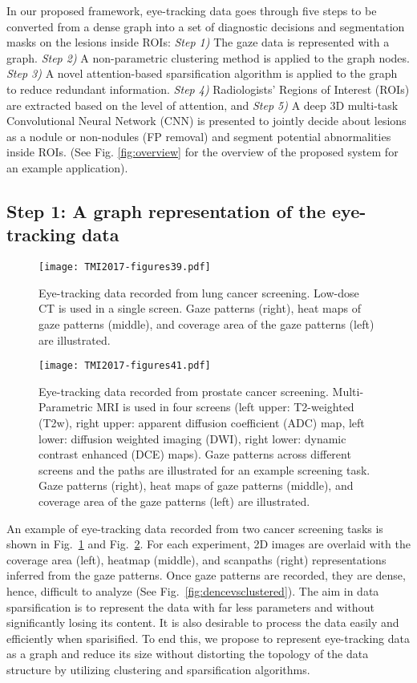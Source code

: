 \documentclass[preprint,12pt]{elsarticle}
\begin{document}
In our proposed framework, eye-tracking data goes through five steps to be converted from a dense graph into a set of diagnostic decisions and segmentation masks on the lesions inside ROIs: \textit{Step 1)} The gaze data is represented with a graph. \textit{Step 2)} A non-parametric clustering method is applied to the graph nodes.\textit{ Step 3)} A novel attention-based sparsification algorithm is applied to the graph to reduce redundant information. \textit{Step 4)} Radiologists' Regions of Interest (ROIs) are extracted based on the level of attention, and  \textit{Step 5)} A deep 3D multi-task Convolutional Neural Network (CNN) is presented to jointly decide about lesions as a nodule or non-nodules (FP removal) and segment potential abnormalities inside ROIs. (See Fig. \ref{fig:overview} for the overview of the proposed system for an example application).






\subsection{Step 1: A graph representation of the eye-tracking data}


\begin{figure}[h]
\centering
\texttt{[image: TMI2017-figures39.pdf]}
\caption{Eye-tracking data recorded from lung cancer screening. Low-dose CT is used in a single screen. Gaze patterns (right), heat maps of gaze patterns (middle), and coverage area of the gaze patterns (left) are illustrated. \label{fig:data1}}
\end{figure}


\begin{figure}[h]
\centering
\texttt{[image: TMI2017-figures41.pdf]}
\caption{Eye-tracking data recorded from prostate cancer screening. Multi-Parametric MRI is used in four screens (left upper: T2-weighted (T2w), right upper: apparent diffusion coefficient (ADC) map, left lower: diffusion weighted imaging (DWI), right lower: dynamic contrast enhanced (DCE) maps). Gaze patterns across different screens and the paths are illustrated for an example screening task. Gaze patterns (right), heat maps of gaze patterns (middle), and coverage area of the gaze patterns (left) are illustrated. \label{fig:data2}}
\end{figure}


An example of eye-tracking data recorded from two cancer screening tasks is shown in Fig.~\ref{fig:data1} and Fig.~\ref{fig:data2}. For each experiment, 2D images are overlaid with the coverage area (left), heatmap (middle), and scanpaths (right) representations inferred from the gaze patterns. Once gaze patterns are recorded, they are dense, hence, difficult to analyze (See Fig.~\ref{fig:dencevsclustered}). The aim in data sparsification is to represent the data with far less parameters and without significantly losing its content. It is also desirable to process the data easily and efficiently when sparisified. To end this, we propose to represent eye-tracking data as a graph and reduce its size without distorting the topology of the data structure by utilizing clustering and sparsification algorithms.
\end{document}
